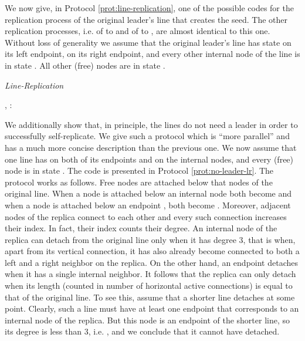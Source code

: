 \documentclass[oribibl, 11pt]{llncs}
\begin{document}
We now give, in Protocol \ref{prot:line-replication}, one of the possible codes for the replication process of the original leader's line that creates the seed. The other replication processes, i.e. of  to  and of  to , are almost identical to this one. Without loss of generality we assume that the original leader's line has state  on its left endpoint,  on its right endpoint, and every other internal node of the line is in state . All other (free) nodes are in state .

\renewcommand{\algorithmiccomment}[1]{// #1}
\begin{algorithm}[!h]
  \caption{\emph{Line-Replication}}\label{prot:line-replication}
  \begin{algorithmic}
    \medskip
    \State  , 
    \State : 
    
\end{algorithmic}
\end{algorithm}

We additionally show that, in principle, the lines do not need a leader in order to successfully self-replicate. We give such a protocol which is ``more parallel'' and has a much more concise description than the previous one. We  now assume that one line has  on both of its endpoints and  on the internal nodes, and every (free) node is in state . The code is presented in Protocol \ref{prot:no-leader-lr}. The protocol works as follows. Free nodes are attached below that nodes of the original line. When a node is attached below an internal node  both become  and when a node is attached below an endpoint , both become . Moreover, adjacent nodes of the replica connect to each other and every such connection increases their index. In fact, their index counts their degree. An internal node of the replica can detach from the original line only when it has degree 3, that is when, apart from its vertical connection, it has also already become connected to both a left and a right neighbor on the replica. On the other hand, an endpoint detaches when it has a single internal neighbor. It follows that the replica can only detach when its length (counted in number of horizontal active connections) is equal to that of the original line. To see this, assume that a shorter line detaches at some point. Clearly, such a line must have at least one endpoint that corresponds to an internal node  of the replica. But this node is an endpoint of the shorter line, so its degree is less than 3, i.e. , and we conclude that it cannot have detached. 
\end{document}
